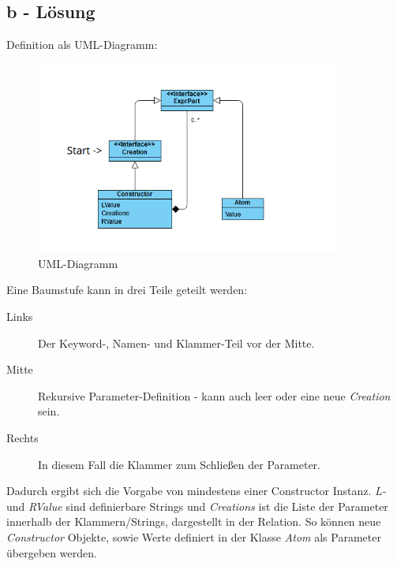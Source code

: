 \subsection*{b - Lösung}
Definition als UML-Diagramm:
\begin{figure}[h]
    \centering
    \includegraphics[width=10cm]{media/Aufgabe2b_Diagramm}
    \caption{UML-Diagramm}
    \label{fig:Aufgabe2b_UML}
\end{figure}
\newline
Eine Baumstufe kann in drei Teile geteilt werden:
\begin{description}
    \item[Links] Der Keyword-, Namen- und Klammer-Teil vor der Mitte.
    \item[Mitte] Rekursive Parameter-Definition - kann auch leer oder eine neue \textit{Creation} sein.
    \item[Rechts] In diesem Fall die Klammer zum Schließen der Parameter.
\end{description}
\newline
Dadurch ergibt sich die Vorgabe von mindestens einer Constructor Instanz.
\textit{L-} und \textit{RValue} sind definierbare Strings und \textit{Creations}
ist die Liste der Parameter innerhalb der Klammern/Strings, dargestellt in der Relation.
So können neue \textit{Constructor} Objekte, sowie Werte definiert in der Klasse \textit{Atom} als Parameter übergeben werden.

